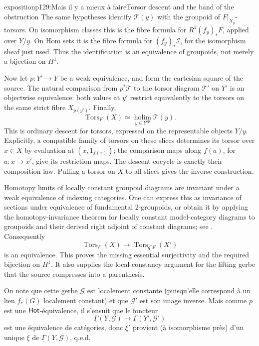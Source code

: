 \begin{dcomment}{exposition}{p129:Mais il y a mieux à faire}{Torsor descent and the band of the obstruction}
The same hypotheses identify \(\mathcal T(y)\) with the groupoid of \(F|_{X_y}\)-torsors. On isomorphism classes this is the fibre formula for \(R^1(f_y)_*F\), applied over \(Y/y\). On Hom sets it is the fibre formula for \((f_y)_*\mathcal I\), for the isomorphism sheaf just used. Thus the identification is an equivalence of groupoids, not merely a bijection on \(H^1\).

Now let \(p:Y'\longrightarrow Y\) be a weak equivalence, and form the cartesian square of the source. The natural comparison from \(p^*\mathcal T\) to the torsor diagram \(\mathcal T'\) on \(Y'\) is an objectwise equivalence: both values at \(y'\) restrict equivalently to the torsors on the same strict fibre \(X_{p(y')}\). Finally,
\[
 \operatorname{Tors}_F(X)
 \simeq \operatorname*{holim}_{y\in Y^{\mathrm{op}}}\mathcal T(y).
\]
This is ordinary descent for torsors, expressed on the representable objects \(Y/y\). Explicitly, a compatible family of torsors on these slices determines its torsor over \(x\in X\) by evaluation at \((x,1_{f(x)})\); the comparison maps along \(f(a)\), for \(a:x\longrightarrow x'\), give its restriction maps. The descent cocycle is exactly their composition law. Pulling a torsor on \(X\) to all slices gives the inverse construction.

Homotopy limits of locally constant groupoid diagrams are invariant under a weak equivalence of indexing categories. One can express this as invariance of sections under equivalence of fundamental \(2\)-groupoids, or obtain it by applying the homotopy-invariance theorem for locally constant model-category diagrams to groupoids and their derived right adjoint of constant diagrams; see \citet[Theorem 1.3]{Cisinski2009LocallyConstant}. Consequently
\[
 \operatorname{Tors}_F(X)\longrightarrow
 \operatorname{Tors}_{q^*F}(X')
\]
is an equivalence. This proves the missing essential surjectivity and the required bijection on \(H^1\). It also supplies the local-constancy argument for the lifting gerbe that the source compresses into a parenthesis.
\end{dcomment}




\noindent On note que cette gerbe $\mathcal{G}$ est localement constante (puisqu'elle correspond à un lien $f_*(G)$ localement constant) et que $\mathcal{G}'$ est son image inverse. Mais comme $p$ est une $\mathsf{Hot}$-équivalence, il s'ensuit que le foncteur
\[
\underline{\Gamma}(Y, \mathcal{G}) \longrightarrow \underline{\Gamma}(Y', \mathcal{G}')
\]
est une équivalence de catégories, donc $\xi'$ provient (à isomorphisme près) d'un unique $\xi$ de $\underline{\Gamma}(Y, \mathcal{G})$, q.e.d.

